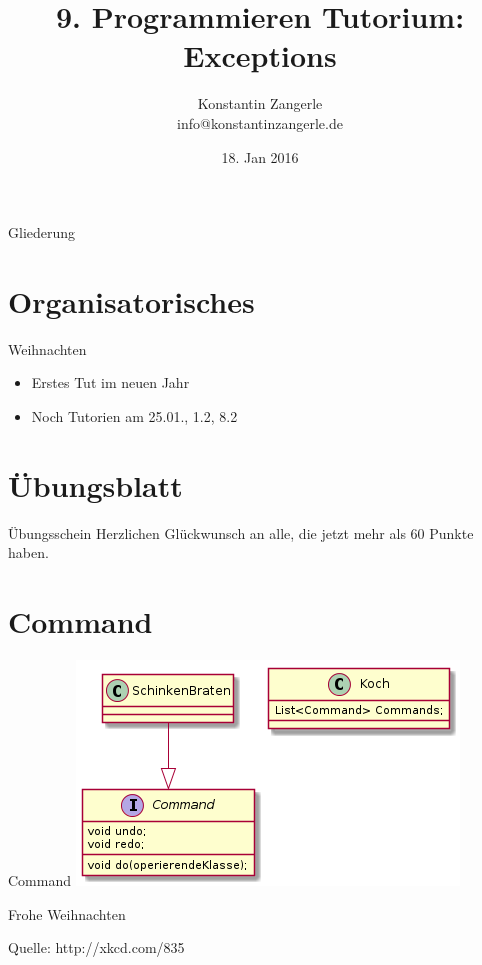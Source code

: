 \documentclass[18pt]{beamer}
\title[Programmieren Tutorium]{9. Programmieren Tutorium:\texorpdfstring{\\}{} Exceptions}
\author{Konstantin Zangerle \texorpdfstring{\\}{} info@konstantinzangerle.de}
\date{18. Jan 2016}
\begin{document}

\begin{frame}
\titlepage
\end{frame}

\begin{frame}{Gliederung}
\tableofcontents
\end{frame}

\section{Organisatorisches}

\begin{frame}{Weihnachten}
 \begin{itemize}
  \item Erstes Tut im neuen Jahr
  \item Noch Tutorien am 25.01., 1.2, 8.2
 \end{itemize}

\end{frame}





\section{Übungsblatt}
\begin{frame}{Übungsschein}
  \large
  Herzlichen Glückwunsch an alle, die jetzt mehr als 60 Punkte haben.
\end{frame}


\section{Command}

\begin{frame}{Command}
 \includegraphics[scale=0.6]{command}
\end{frame}


\begin{frame}{Frohe Weihnachten}
 
 Quelle: http://xkcd.com/835
\end{frame}
\end{document}
